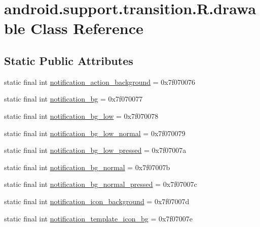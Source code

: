 \hypertarget{classandroid_1_1support_1_1transition_1_1_r_1_1drawable}{}\section{android.\+support.\+transition.\+R.\+drawable Class Reference}
\label{classandroid_1_1support_1_1transition_1_1_r_1_1drawable}
\subsection*{Static Public Attributes}
\begin{DoxyCompactItemize}
\item 
static final int \mbox{\hyperlink{classandroid_1_1support_1_1transition_1_1_r_1_1drawable_aa63a282bba48259acff502a4c32c48dd}{notification\+\_\+action\+\_\+background}} = 0x7f070076
\item 
static final int \mbox{\hyperlink{classandroid_1_1support_1_1transition_1_1_r_1_1drawable_a4e2d76cf7e408949c2b4a0776c7d683e}{notification\+\_\+bg}} = 0x7f070077
\item 
static final int \mbox{\hyperlink{classandroid_1_1support_1_1transition_1_1_r_1_1drawable_a80e92867febdd3ad8ce052e040508e3c}{notification\+\_\+bg\+\_\+low}} = 0x7f070078
\item 
static final int \mbox{\hyperlink{classandroid_1_1support_1_1transition_1_1_r_1_1drawable_a9fa9887b0c07972b38d4759215a9514c}{notification\+\_\+bg\+\_\+low\+\_\+normal}} = 0x7f070079
\item 
static final int \mbox{\hyperlink{classandroid_1_1support_1_1transition_1_1_r_1_1drawable_a5fe6e84c8b7aaf6841d0d37d1fba6dbb}{notification\+\_\+bg\+\_\+low\+\_\+pressed}} = 0x7f07007a
\item 
static final int \mbox{\hyperlink{classandroid_1_1support_1_1transition_1_1_r_1_1drawable_a5331c92aadadaaf082aadfe262fcfaf8}{notification\+\_\+bg\+\_\+normal}} = 0x7f07007b
\item 
static final int \mbox{\hyperlink{classandroid_1_1support_1_1transition_1_1_r_1_1drawable_a267ef5dc70197b1688c3a36f7d3a514d}{notification\+\_\+bg\+\_\+normal\+\_\+pressed}} = 0x7f07007c
\item 
static final int \mbox{\hyperlink{classandroid_1_1support_1_1transition_1_1_r_1_1drawable_ab61974a44b1c6b8eafba4027955dac77}{notification\+\_\+icon\+\_\+background}} = 0x7f07007d
\item 
static final int \mbox{\hyperlink{classandroid_1_1support_1_1transition_1_1_r_1_1drawable_a0a2b6625f2aae8b0f520911b4dfe0c42}{notification\+\_\+template\+\_\+icon\+\_\+bg}} = 0x7f07007e

\end{DoxyCompactItemize}
